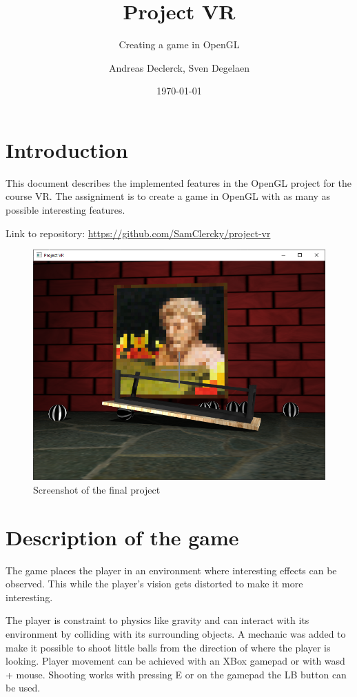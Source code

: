 \documentclass[]{article}
\title{Project VR}
\subtitle{Creating a game in OpenGL}
\author{Andreas Declerck, Sven Degelaen}
\date{\today}
\begin{document}
\maketitle

\section{Introduction}

This document describes the implemented features in the OpenGL project for the
course VR. The assigniment is to create a game in OpenGL with as many as possible
interesting features.

Link to repository: \url{https://github.com/SamClercky/project-vr}

\begin{figure}[h!]
      \centering
      \includegraphics[width=\textwidth]{screenshot.png}
      \caption{Screenshot of the final project}
      \label{fig:screenshot}
\end{figure}

\section{Description of the game}

The game places the player in an environment where interesting effects can be
observed. This while the player's vision gets distorted to make it more
interesting.

The player is constraint to physics like gravity and can interact with its
environment by colliding with its surrounding objects. A mechanic was added
to make it possible to shoot little balls from the direction of where the
player is looking. Player movement can be achieved with an XBox gamepad or with
wasd + mouse. Shooting works with pressing E or on the gamepad the LB
button can be used.
\end{document}
